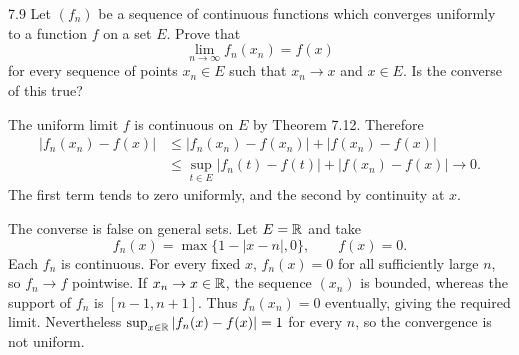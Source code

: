 \documentclass[11pt, oneside]{article}
\begin{document}
\begin{exercise}{7.9}
Let $(f_n)$ be a sequence of continuous functions which converges uniformly to a function $f$ on a set $E$. Prove that
\[
 \lim_{n\to\infty}f_n(x_n)=f(x)
\]
for every sequence of points $x_n\in E$ such that $x_n\to x$ and $x\in E$. Is the converse of this true?
\end{exercise}
\begin{solution}
The uniform limit $f$ is continuous on $E$ by Theorem 7.12. Therefore
\[
 \begin{aligned}
 |f_n(x_n)-f(x)|
 &\le |f_n(x_n)-f(x_n)|+|f(x_n)-f(x)|\\
 &\le\sup_{t\in E}|f_n(t)-f(t)|+|f(x_n)-f(x)|\longrightarrow0.
 \end{aligned}
\]
The first term tends to zero uniformly, and the second by continuity at $x$.

The converse is false on general sets. Let $E=\mathbb{R}$ and take
\[
 f_n(x)=\max\{1-|x-n|, 0\}, \qquad f(x)=0.
\]
Each $f_n$ is continuous. For every fixed $x$, $f_n(x)=0$ for all sufficiently large $n$, so $f_n\to f$ pointwise. If $x_n\to x\in\mathbb{R}$, the sequence $(x_n)$ is bounded, whereas the support of $f_n$ is $[n-1, n+1]$. Thus $f_n(x_n)=0$ eventually, giving the required limit. Nevertheless $\sup_{x\in\mathbb{R}}|f_n(x)-f(x)|=1$ for every $n$, so the convergence is not uniform.
\end{solution}
\end{document}
